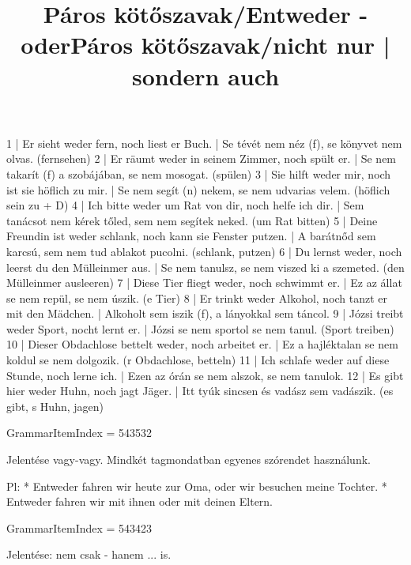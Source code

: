 \begin{exmp}
1 | Er sieht weder fern, noch liest er Buch. | Se tévét nem néz (f), se könyvet nem olvas. (fernsehen)
2 | Er räumt weder in seinem Zimmer, noch spült er. | Se nem takarít (f) a szobájában, se nem mosogat. (spülen)
3 | Sie hilft weder mir, noch ist sie höflich zu mir. |  Se nem segít (n) nekem, se nem udvarias velem. (höflich sein zu + D)
4 | Ich bitte weder um Rat von dir, noch helfe ich dir. | Sem tanácsot nem kérek tőled, sem nem segítek neked. (um Rat bitten)
5 | Deine Freundin ist weder schlank, noch kann sie Fenster putzen. | A barátnőd sem karcsú, sem nem tud ablakot pucolni. (schlank, putzen)
6 | Du lernst weder, noch leerst du den Mülleinmer aus. | Se nem tanulsz, se nem viszed ki a szemeted. (den Mülleinmer ausleeren)
7 | Diese Tier fliegt weder, noch schwimmt er. | Ez az állat se nem repül, se nem úszik. (e Tier)
8 | Er trinkt weder Alkohol, noch tanzt er mit den Mädchen. | Alkoholt sem iszik (f), a lányokkal sem táncol.
9 | Józsi treibt weder Sport, nocht lernt er. | Józsi se nem sportol se nem tanul. (Sport treiben)
10 | Dieser Obdachlose bettelt weder, noch arbeitet er. | Ez a hajléktalan se nem koldul se nem dolgozik. (r Obdachlose, betteln)
11 | Ich schlafe weder auf diese Stunde, noch lerne ich. | Ezen az órán se nem alszok, se nem tanulok.
12 | Es gibt hier weder Huhn, noch jagt Jäger. | Itt tyúk sincsen és vadász sem vadászik. (es gibt, s Huhn, jagen)
\end{exmp}

\title{Páros kötőszavak/Entweder - oder}

GrammarItemIndex = 543532

\begin{desc}
Jelentése vagy-vagy.
Mindkét tagmondatban egyenes szórendet használunk.

Pl: * Entweder fahren wir heute zur Oma, oder wir besuchen meine Tochter.
* Entweder fahren wir mit ihnen oder mit deinen Eltern.
\end{desc}

\begin{exmp}
\end{exmp}

\title{Páros kötőszavak/nicht nur | sondern auch}

GrammarItemIndex = 543423

\begin{desc}
Jelentése: nem csak - hanem ... is.
\end{desc}

\begin{exmp}
\end{exmp}

